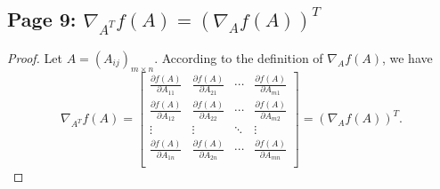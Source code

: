 \documentclass{article}
\begin{document}
\subsection{Page 9: $\nabla_{A^T}f(A)=(\nabla_{A}f(A))^T$}
\begin{proof}
Let $A=(A_{ij})_{m\times{n}}$. According to the definition of $\nabla_{A}f(A)$, we have
\[
\nabla_{A^T}f(A)=
\begin{bmatrix}
\frac{\partial{f(A)}}{\partial{A_{11}}} & \frac{\partial{f(A)}}{\partial{A_{21}}} & \cdots & \frac{\partial{f(A)}}{\partial{A_{m1}}}\\
\frac{\partial{f(A)}}{\partial{A_{12}}} & \frac{\partial{f(A)}}{\partial{A_{22}}} & \cdots & \frac{\partial{f(A)}}{\partial{A_{m2}}} \\
\vdots & \vdots & \ddots & \vdots\\
\frac{\partial{f(A)}}{\partial{A_{1n}}} & \frac{\partial{f(A)}}{\partial{A_{2n}}} & \cdots & \frac{\partial{f(A)}}{\partial{A_{mn}}} \\
\end{bmatrix}
=(\nabla_{A}f(A))^T.
\]
\end{proof}
\end{document}
